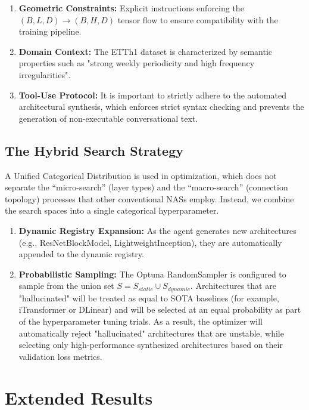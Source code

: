 \documentclass{article}
\begin{document}
\begin{enumerate}
\item \textbf{Geometric Constraints:} Explicit instructions enforcing the $(B, L, D) \to (B, H, D)$ tensor flow to ensure compatibility with the training pipeline.

\item \textbf{Domain Context:} The ETTh1 dataset is characterized by semantic properties such as "strong weekly periodicity and high frequency irregularities".

\item \textbf{Tool-Use Protocol:} It is important to strictly adhere to the automated architectural synthesis, which enforces strict syntax checking and prevents the generation of non-executable conversational text.
\end{enumerate}

\subsection{The Hybrid Search Strategy}
A Unified Categorical Distribution is used in optimization, which does not separate the “micro-search” (layer types) and the “macro-search” (connection topology) processes that other conventional NASs employ. Instead, we combine the search spaces into a single categorical hyperparameter.

\begin{enumerate}
\item \textbf{Dynamic Registry Expansion:} As the agent generates new architectures (e.g., ResNetBlockModel, LightweightInception), they are automatically appended to the dynamic registry.

\item \textbf{Probabilistic Sampling:} The Optuna RandomSampler is configured to sample from the union set $S = S_{static} \cup S_{dynamic}$. Architectures that are "hallucinated" will be treated as equal to SOTA baselines (for example, iTransformer or DLinear) and will be selected at an equal probability as part of the hyperparameter tuning trials. As a result, the optimizer will automatically reject "hallucinated" architectures that are unstable, while selecting only high-performance synthesized architectures based on their validation loss metrics.
\end{enumerate}


\section{Extended Results}
\label{app:extended_results}
\end{document}
